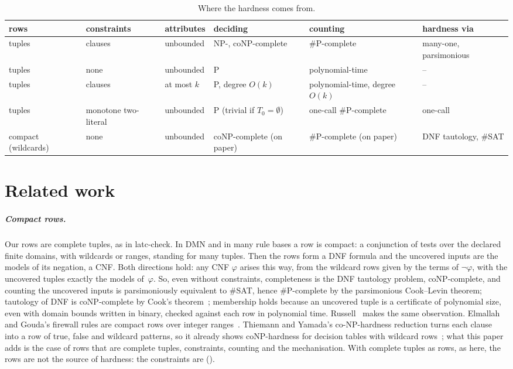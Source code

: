 \documentclass[a4paper,UKenglish,cleveref,autoref,thm-restate]{lipics-v2021}
\begin{document}
\begin{table}[t]
\caption{Where the hardness comes from.}
\label{tab:boundary}
\centering\small
\begin{tabular}{L{0.11\textwidth}L{0.13\textwidth}L{0.12\textwidth}L{0.15\textwidth}L{0.16\textwidth}L{0.14\textwidth}}
\hline
rows & constraints & attributes & deciding & counting & hardness via \\
\hline
tuples & clauses & unbounded & NP-, coNP-complete & \#P-complete & many-one, parsimonious \\
tuples & none & unbounded & P & polynomial-time & -- \\
tuples & clauses & at most $k$ & P, degree $O(k)$ & polynomial-time, degree $O(k)$ & -- \\
tuples & monotone two-literal & unbounded & P (trivial if $T_0 = \emptyset$) & one-call \#P-complete & one-call \\
compact (wildcards) & none & unbounded & coNP-complete (on paper) & \#P-complete (on paper) & DNF tautology, \#SAT \\
\hline
\end{tabular}
\end{table}

\section{Related work}
\label{sec:related}

\subparagraph*{Compact rows.}
Our rows are complete tuples, as in latc-check. In DMN and in many rule bases a row is compact: a
conjunction of tests over the declared finite domains, with wildcards or ranges, standing for
many tuples. Then the rows form a DNF formula and the uncovered inputs are the models of its
negation, a CNF. Both directions hold: any CNF $\varphi$ arises this way, from the wildcard rows
given by the terms of $\neg\varphi$, with the uncovered tuples exactly the models of~$\varphi$.
So, even without constraints, completeness is the DNF tautology problem, coNP-complete, and
counting the uncovered inputs is parsimoniously equivalent to \#SAT, hence \#P-complete by
the parsimonious Cook--Levin theorem; tautology of DNF is coNP-complete by Cook's
theorem~\cite{Cook1971}; membership holds because an uncovered tuple is a certificate of
polynomial size, even with domain bounds written in binary, checked against each row in
polynomial time. Russell~\cite{PaperA} makes the same observation. Elmallah and Gouda's firewall
rules are compact rows over integer ranges~\cite{ElmallahGouda2017}. Thiemann and Yamada's
co-NP-hardness reduction turns each clause into a row of true, false and wildcard patterns, so it
already shows coNP-hardness for decision tables with wildcard rows~\cite{ThiemannYamada2026};
what this paper adds is the case of rows that are complete tuples, constraints, counting and the
mechanisation. With complete tuples as
rows, as here, the rows are not the source of hardness: the constraints are
().
\end{document}
